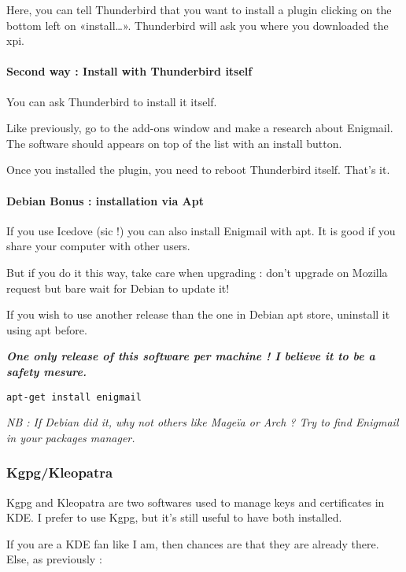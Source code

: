 Here, you can tell Thunderbird that you want to install a plugin
clicking on the bottom left on «install\ldots{}». Thunderbird will ask
you where you downloaded the xpi.

\paragraph{Second way : Install with Thunderbird
itself}\label{second-way-install-with-thunderbird-itself}

You can ask Thunderbird to install it itself.

Like previously, go to the add-ons window and make a research about
Enigmail. The software should appears on top of the list with an install
button.

Once you installed the plugin, you need to reboot Thunderbird itself.
That's it.

\paragraph{Debian Bonus : installation via
Apt}\label{debian-bonus-installation-via-apt}

If you use Icedove (sic !) you can also install Enigmail with apt. It is
good if you share your computer with other users.

But if you do it this way, take care when upgrading : don't upgrade on
Mozilla request but bare wait for Debian to update it!

If you wish to use another release than the one in Debian apt store,
uninstall it using apt before.

\textbf{\emph{One only release of this software per machine ! I believe
it to be a safety mesure.}}

\begin{verbatim}
apt-get install enigmail
\end{verbatim}

\emph{NB : If Debian did it, why not others like Mageïa or Arch ? Try to
find Enigmail in your packages manager.}

\subsubsection{Kgpg/Kleopatra}\label{kgpgkleopatra}

Kgpg and Kleopatra are two softwares used to manage keys and
certificates in KDE. I prefer to use Kgpg, but it's still useful to have
both installed.

If you are a KDE fan like I am, then chances are that they are already
there.\\Else, as previously :

